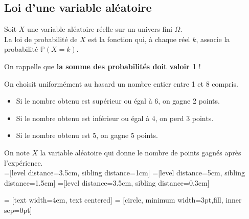\documentclass[11pt,fleqn, openany]{book} %
\begin{document}
\subsection{Loi d'une variable aléatoire}


\begin{definition}Soit $X$ une variable aléatoire réelle sur un univers fini $\Omega$.\\
La loi de probabilité de $X$ est la fonction qui, à chaque réel $k$, associe la probabilité  $\mathbb{P}(X=k)$.\end{definition}

On rappelle que \textbf{la somme des probabilités doit valoir 1} !

\begin{example}On choisit uniformément au hasard un nombre entier entre 1 et 8 compris.

\begin{itemize}
\item Si le nombre obtenu est supérieur ou égal à 6, on gagne 2 points.
\item Si le nombre obtenu est inférieur ou égal à 4, on perd 3 points.
\item Si le nombre obtenu est 5, on gagne 5 points.
\end{itemize}
On note $X$ la variable aléatoire qui donne le nombre de points gagnés après l'expérience.\\


=[level distance=3.5cm, sibling distance=1cm]
=[level distance=5cm, sibling distance=1.5cm]
=[level distance=3.5cm, sibling distance=0.3cm]

 = [text width=4em, text centered]
 = [circle, minimum width=3pt,fill, inner sep=0pt]



\end{example}
\end{document}
